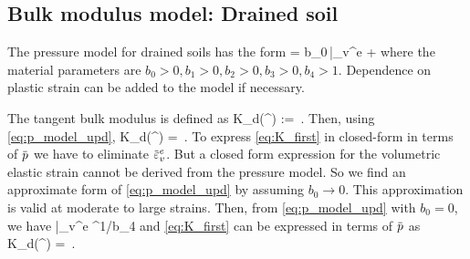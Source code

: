   \subsection{Bulk modulus model: Drained soil}
  The pressure model for drained soils has the form
  \Beq \label{eq:p_model_upd}
     = b_0\,\bar{\Veps_v^e} + 
  \Eeq
  where the material parameters are $b_0 > 0, b_1 > 0, b_2 > 0, b_3 > 0, b_4 > 1$. 
  Dependence on plastic strain can be added to the model if necessary.  

  The tangent bulk modulus is defined as
  \Beq \label{eq:K_def}
    K_d(\pbar^\Teff) :=  \,.
  \Eeq
  Then, using \eqref{eq:p_model_upd}, 
  \Beq \label{eq:K_first}
    K_d(\pbar^\Teff) = 
       \,.
  \Eeq
  To express \eqref{eq:K_first} in closed-form in terms of $\pbar$ we have to eliminate $\bar{\Veps}_v^e$.  
  But a closed form expression for the volumetric elastic strain cannot be derived from the pressure model.
  So we find an approximate form of \eqref{eq:p_model_upd} by assuming $b_0 \rightarrow 0$.  This 
  approximation is valid at moderate to large strains.  Then, from \eqref{eq:p_model_upd} with $b_0 = 0$, 
  we have
  \Beq
   \bar{\Veps_v^e} \approx {}^{1/b_4} 
  \Eeq
  and \eqref{eq:K_first} can be expressed in terms of $\pbar$ as
  \Beq \label{eq:K_dry}
    K_d(\pbar^\Teff) = 
        \,.
  \Eeq

